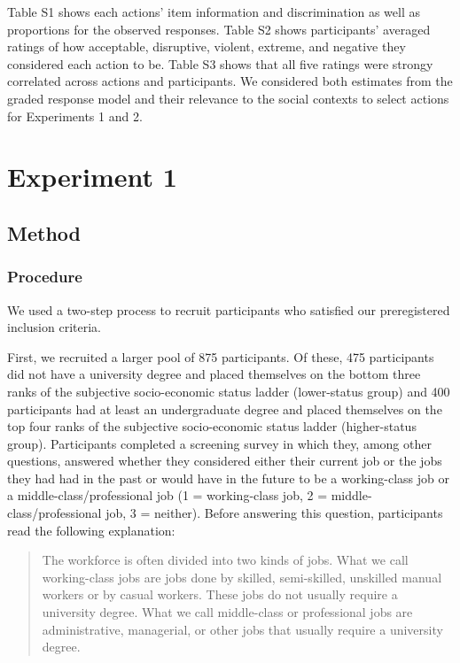 \documentclass[12pt, letterpaper]{article}
\begin{document}
Table S1 shows each actions' item information and discrimination as well
as proportions for the observed responses. Table S2 shows participants'
averaged ratings of how acceptable, disruptive, violent, extreme, and
negative they considered each action to be. Table S3 shows that all five
ratings were strongy correlated across actions and participants. We
considered both estimates from the graded response model and their
relevance to the social contexts to select actions for Experiments 1 and
2.

\hypertarget{experiment-1}{%
\section{Experiment 1}\label{experiment-1}}

\hypertarget{method}{%
\subsection{Method}\label{method}}

\hypertarget{procedure}{%
\subsubsection{Procedure}\label{procedure}}

We used a two-step process to recruit participants who satisfied our
preregistered inclusion criteria.

First, we recruited a larger pool of 875 participants. Of these, 475
participants did not have a university degree and placed themselves on
the bottom three ranks of the subjective socio-economic status ladder
(lower-status group) and 400 participants had at least an undergraduate
degree and placed themselves on the top four ranks of the subjective
socio-economic status ladder (higher-status group). Participants
completed a screening survey in which they, among other questions,
answered whether they considered either their current job or the jobs
they had had in the past or would have in the future to be a
working-class job or a middle-class/professional job (1 = working-class
job, 2 = middle-class/professional job, 3 = neither). Before answering
this question, participants read the following explanation:

\begin{quote}
The workforce is often divided into two kinds of jobs. What we call
working-class jobs are jobs done by skilled, semi-skilled, unskilled
manual workers or by casual workers. These jobs do not usually require a
university degree. What we call middle-class or professional jobs are
administrative, managerial, or other jobs that usually require a
university degree.
\end{quote}
\end{document}
